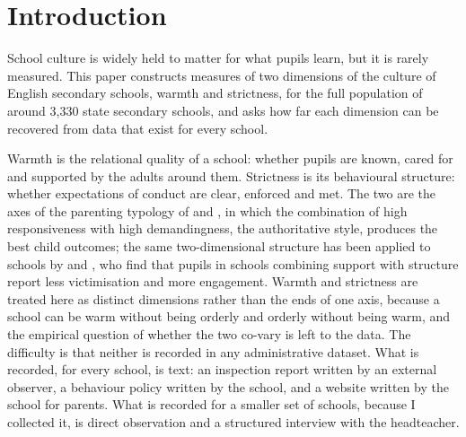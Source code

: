 
\section{Introduction}
\label{sec:p1_intro}

School culture is widely held to matter for what pupils learn, but it is
rarely measured. This paper constructs measures of two dimensions of the
culture of English secondary schools, warmth and strictness, for the full
population of around 3,330 state secondary schools, and asks how far each
dimension can be recovered from data that exist for every school.

Warmth is the relational quality of a school: whether pupils are known,
cared for and supported by the adults around them. Strictness is its
behavioural structure: whether expectations of conduct are clear, enforced
and met. The two are the axes of the parenting typology of
\citet{baumrind1971} and \citet{maccoby1983}, in which the combination of
high responsiveness with high demandingness, the authoritative style,
produces the best child outcomes; the same two-dimensional structure has been
applied to schools by \citet{pellerin2005} and \citet{gregory2010}, who find
that pupils in schools combining support with structure report less
victimisation and more engagement. Warmth and strictness are treated here as
distinct dimensions rather than the ends of one axis, because a school can be
warm without being orderly and orderly without being warm, and the empirical
question of whether the two co-vary is left to the data. The difficulty is
that neither is recorded in any administrative dataset. What is
recorded, for every school, is text: an inspection report written by an
external observer, a behaviour policy written by the school, and a website
written by the school for parents. What is recorded for a smaller set of
schools, because I collected it, is direct observation and a structured
interview with the headteacher.

